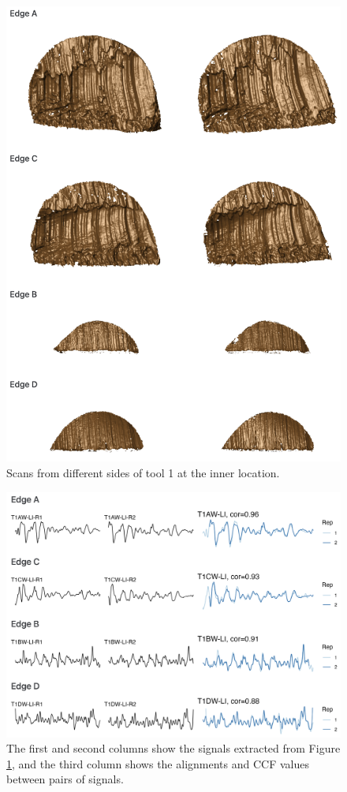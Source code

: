 \documentclass[fleqn,10pt]{wlscirep}
\begin{document}
\begin{figure}[ht]
\centering
\includegraphics[width=0.8\linewidth]{scans_pair.png}
\caption{Scans from different sides of tool 1 at the inner location.}
\label{fig-scans-pair}
\end{figure}

\begin{figure}[ht]
\centering
\includegraphics[width=0.8\linewidth]{signals_pair_alignment.png}
\caption{The first and second columns show the signals extracted from Figure \ref{fig-scans-pair}, and the third column shows the alignments and CCF values between pairs of signals.}
\label{fig-signals-pair-alignment}
\end{figure}
\end{document}
